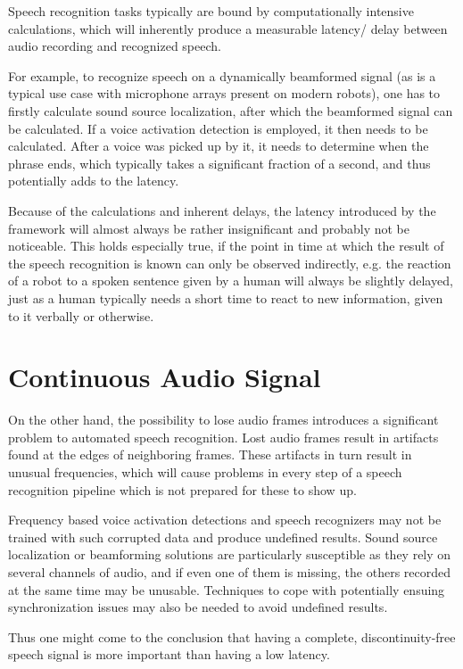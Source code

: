 Speech recognition tasks typically are bound by computationally intensive calculations, which will inherently produce a measurable latency/ delay between audio recording and recognized speech.  
	
For example, to recognize speech on a dynamically beamformed signal (as is a typical use case with microphone arrays present on modern robots), one has to firstly calculate sound source localization, after which the beamformed signal can be calculated.
If a voice activation detection is employed, it then needs to be calculated. 
After a voice was picked up by it, it needs to determine when the phrase ends, which typically takes a significant fraction of a second, and thus potentially adds to the latency. 
	
Because of the calculations and inherent delays, the latency introduced by the framework will almost always be rather insignificant and probably not be noticeable. 
This holds especially true, if the point in time at which the result of the speech recognition is known can only be observed indirectly, e.g. the reaction of a robot to a spoken sentence given by a human will always be slightly delayed, just as a human typically needs a short time to react to new information, given to it verbally or otherwise.

\section{Continuous Audio Signal}
On the other hand, the possibility to lose audio frames introduces a significant problem to automated speech recognition.
Lost audio frames result in artifacts found at the edges of neighboring frames. 
These artifacts in turn result in unusual frequencies, which will cause problems in every step of a speech recognition pipeline which is not prepared for these to show up. 

Frequency based voice activation detections and speech recognizers may not be trained with such corrupted data and produce undefined results.
Sound source localization or beamforming solutions are particularly susceptible as they rely on several channels of audio, and if even one of them is missing, the others recorded at the same time may be unusable.
Techniques to cope with potentially ensuing synchronization issues may also be needed to avoid undefined results.
	
Thus one might come to the conclusion that having a complete, discontinuity-free speech signal is more important than having a low latency. 

